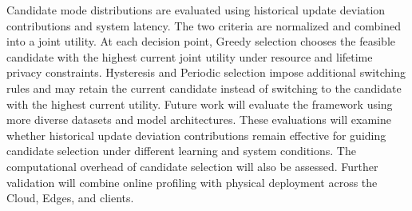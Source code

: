 \documentclass[5p,times]{elsarticle}
\theoremstyle{plain}
\theoremstyle{definition}
\theoremstyle{remark}
\begin{document}
	Candidate mode distributions are evaluated using
	historical update deviation contributions and system
	latency. The two criteria are normalized and combined
	into a joint utility. At each decision point, Greedy
	selection chooses the feasible candidate with the
	highest current joint utility under resource and
	lifetime privacy constraints. Hysteresis and Periodic
	selection impose additional switching rules and may
	retain the current candidate instead of switching
	to the candidate with the highest current utility.
	Future work will evaluate the framework using more diverse datasets and model architectures. These evaluations will examine whether historical update deviation contributions remain effective for guiding candidate selection under different learning and system conditions. The computational overhead of candidate selection will also be assessed. Further validation will combine online profiling with physical deployment across the Cloud, Edges, and clients.
	
	\appendix
	
	
	
\end{document}
